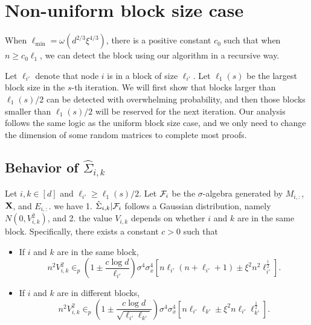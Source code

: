 \section{Non-uniform block size case}

When $\ell_{\min} = \omega(d^{2/3}\xi^{4/3})$, there is a positive constant $c_0$ such that when $n \geq c_0 \ell_1$, we can detect the block using our algorithm in a recursive way.

Let $\ell_{i'}$ denote that node $i$ is in a block of size $\ell_{i'}$. Let $\ell_1(s)$ be the largest block size in the $s$-th iteration. We will first show that blocks larger than $\ell_1(s)/2$ can be detected with overwhelming probability, and then those blocks smaller than $\ell_1(s)/2$ will be reserved for the next iteration. Our analysis follows the same logic as the uniform block size case, and we only need to change the dimension of some random matrices to complete most proofs.

\subsection{Behavior of $\hat \Sigma_{i,k}$}
\begin{lemma}\label{lem:boundSigma_n} Let $i, k \in [d]$ and $\ell_{i'} \geq \ell_1(s)/2$. Let $\mathcal{F}_i$ be the $\sigma$-algebra generated by $M_{i, :}$, $\mathbf{X}$, and $E_{i,:}$.
we have 1. $\hat \Sigma_{i,k} | \mathcal{F}_i$ follows a Gaussian distribution, namely $N(0, V^2_{i,k})$, and 2. the value $V_{i,k}$ depends on whether $i$ and $k$ are in the same block. Specifically, there exists a constant $c > 0$ such that
     
     \begin{itemize}
        \item If $i$ and $k$ are in the same block,  
            \begin{equation}
                n^2V^2_{i,k} \in_p (1\pm \frac{c\log d}{\ell_{i'}})\sigma^4\sigma^4_x[n\ell_{i'}(n + \ell_{i'} +1) \pm \xi^2 n^2 \ell_{i'}^{\frac{1}{2}}]. 
            \end{equation}
        \item If $i$ and $k$ are in different blocks, 
        \begin{equation}
             n^2V^2_{i,k} 
            \in_{p} (1 \pm \frac{c\log d}{\sqrt{\ell_{i'}\ell_{k'}}}) \sigma^4\sigma^4_x [n \ell_{i'}\ell_{k'} \pm \xi^2 n\ell_{i'}\ell_{k'}^{\frac{1}{2}}].
         \end{equation}
    \end{itemize}
\end{lemma}

